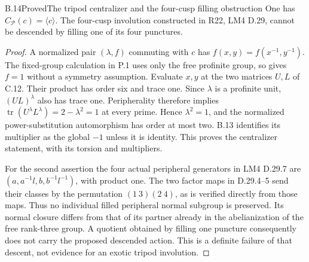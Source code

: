 \begin{statement}{B.14}{Proved}{The tripod centralizer and the four-cusp filling obstruction}
One has $C_{\mathcal P}(c)=\langle c\rangle$.
The four-cusp involution constructed in R22, LM4 D.29, cannot be
descended by filling one of its four punctures.
\end{statement}
\begin{proof}
A normalized pair $(\lambda,f)$ commuting with $c$ has
$f(x,y)=f(x^{-1},y^{-1})$. The fixed-group calculation in P.1
uses only the free profinite group, so gives $f=1$ without a
symmetry assumption. Evaluate $x,y$ at the two matrices $U,L$
of C.12. Their product has order six and trace one. Since
$\lambda$ is a profinite unit, $(UL)^\lambda$ also has trace one.
Peripherality therefore implies
$\operatorname{tr}(U^\lambda L^\lambda)=2-\lambda^2=1$ at every
prime. Hence $\lambda^2=1$, and the normalized power-substitution
automorphism has order at most two. B.13 identifies its multiplier
as the global $-1$ unless it is identity. This proves the
centralizer statement, with its torsion and multipliers.

For the second assertion the four actual peripheral generators in
LM4 D.29.7 are $(a,a^{-1}l,b,b^{-1}l^{-1})$, with product one.
The two factor maps in D.29.4--5 send their classes by the
permutation $(1\ 3)(2\ 4)$, as is verified directly from those
maps. Thus no individual filled peripheral normal subgroup is
preserved. Its normal closure differs from that of its partner
already in the abelianization of the free rank-three group.
A quotient obtained by filling one puncture consequently does
not carry the proposed descended action. This is a definite
failure of that descent, not evidence for an exotic tripod involution.
\end{proof}

